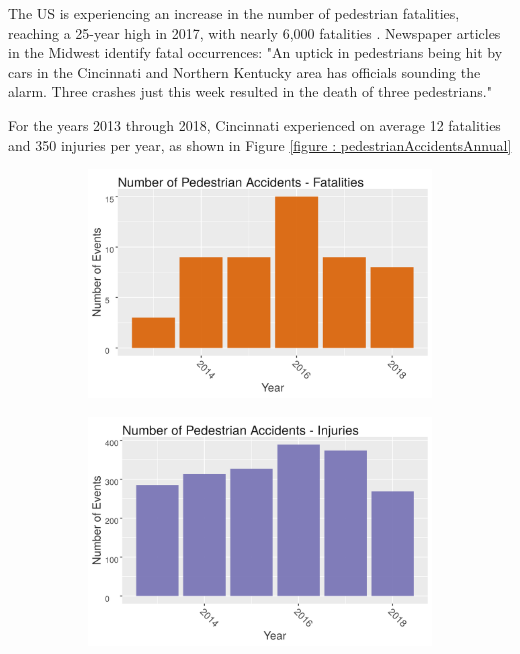 \documentclass{llncs}
\begin{document}
The US is experiencing an increase in the number of pedestrian fatalities, reaching a 25-year high in 2017, with nearly 6,000 fatalities \cite{domonoske2018pedestrian}. Newspaper articles in the Midwest identify fatal occurrences: \cite{kelley2018police} "An uptick in pedestrians being hit by cars in the Cincinnati and Northern Kentucky area has officials sounding the alarm. Three crashes just this week resulted in the death of three pedestrians."

For the years 2013 through 2018, Cincinnati experienced on average 12 fatalities and 350 injuries per year, as shown in Figure \ref{figure : pedestrianAccidentsAnnual}

\FloatBarrier
\begin{figure}
 	\caption{Number of Pedestrian Accidents}
 	\label{figure : pedestrianAccidentsAnnual}
  		\begin{subfigure}[b]{0.5\textwidth}
    	\includegraphics[width = \textwidth, height = \textheight, keepaspectratio]{pedestrianAccidentNumFatalities.png}
    	\label{figure : pedestrianAccidentNumFatalities}
  	\end{subfigure}
  \begin{subfigure}[b]{0.5\textwidth}
    \includegraphics[width = \textwidth, height = \textheight, keepaspectratio]{pedestrianAccidentNumInjuries.png}
    \label{figure : pedestrianAccidentNumInjuries}
  \end{subfigure}
\end{figure}
\FloatBarrier
\end{document}
